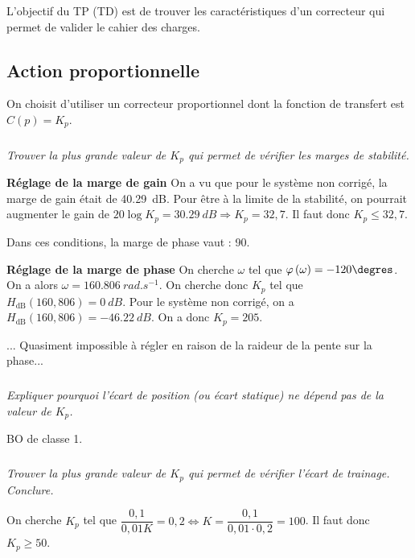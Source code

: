 \documentclass[10pt,fleqn]{article} %
\begin{document}
\begin{multicols}{2}
\begin{corrige}
\end{corrige}
\else
\fi

\begin{obj}
L’objectif du TP (TD) est de trouver les caractéristiques d’un correcteur qui permet de valider le cahier des charges.
\end{obj}

\subsection*{Action proportionnelle}


On choisit d’utiliser un correcteur proportionnel dont la fonction de transfert est $C(p)=K_p$.
\subparagraph{}
\textit{Trouver la plus grande valeur de $K_p$ qui permet de vérifier les marges de stabilité.}
\ifprof
\begin{corrige}
\textbf{Réglage de la marge de gain}
On a vu que pour le système non corrigé, la marge de gain était de \SI{40,29}{dB}. Pour être à la limite de la stabilité, on pourrait augmenter le gain de $20\log K_p = \SI{30,29}{dB} \Rightarrow K_p = {32,7} $. Il faut donc $K_p\leq 32,7$.

Dans ces conditions, la marge de phase vaut : 90\degres.

\textbf{Réglage de la marge de phase}
On cherche $\omega$ tel que $\varphi\left( \omega\right)=-120\degres$. On a alors $\omega=\SI{160,806}{rad.s^{-1}}$. On cherche donc $K_p $ tel que $H_{\text{dB}}(160,806)=\SI{0}{dB}$. Pour le système non corrigé, on a $H_{\text{dB}}(160,806)=-\SI{46,22}{dB}$. On a donc $K_p = 205$.

... Quasiment impossible à régler en raison de la raideur de la pente sur la phase...

\end{corrige}
\else
\fi

\subparagraph{}
\textit{Expliquer pourquoi l’écart de position (ou écart statique) ne dépend pas de la valeur de $K_p$.}
\ifprof
\begin{corrige}
BO de classe 1. 
\end{corrige}
\else
\fi

\subparagraph{}
\textit{Trouver la plus grande valeur de $K_p$ qui permet de vérifier l'écart de trainage. Conclure.}
\ifprof
\begin{corrige}
On cherche $K_p$ tel que $\dfrac{0,1}{0,01K}=0,2 \Leftrightarrow K=\dfrac{0,1}{0,01\cdot 0,2 }= 100$. Il faut donc $K_p\geq50$.
\end{corrige}
\else
\fi


\end{multicols}
\end{document}
